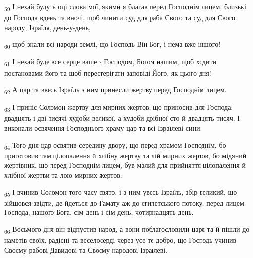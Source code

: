 \begin{tcolorbox}
\textsubscript{59} І нехай будуть оці слова мої, якими я благав перед Господнім лицем, близькі до Господа вдень та вночі, щоб чинити суд для раба Свого та суд для Свого народу, Ізраїля, день-у-день,
\end{tcolorbox}
\begin{tcolorbox}
\textsubscript{60} щоб знали всі народи землі, що Господь Він Бог, і нема вже іншого!
\end{tcolorbox}
\begin{tcolorbox}
\textsubscript{61} І нехай буде все серце ваше з Господом, Богом нашим, щоб ходити постановами його та щоб перестерігати заповіді Його, як цього дня!
\end{tcolorbox}
\begin{tcolorbox}
\textsubscript{62} А цар та ввесь Ізраїль з ним принесли жертву перед Господнім лицем.
\end{tcolorbox}
\begin{tcolorbox}
\textsubscript{63} І приніс Соломон жертву для мирних жертов, що приносив для Господа: двадцять і дві тисячі худоби великої, а худоби дрібної сто й двадцять тисяч. І виконали освячення Господнього храму цар та всі Ізраїлеві сини.
\end{tcolorbox}
\begin{tcolorbox}
\textsubscript{64} Того дня цар освятив середину двору, що перед храмом Господнім, бо приготовив там цілопалення й хлібну жертву та лій мирних жертов, бо мідяний жертівник, що перед Господнім лицем, був малий для прийняття цілопалення й хлібної жертви та лою мирних жертов.
\end{tcolorbox}
\begin{tcolorbox}
\textsubscript{65} І вчинив Соломон того часу свято, і з ним увесь Ізраїль, збір великий, що зійшовся звідти, де йдеться до Гамату аж до єгипетського потоку, перед лицем Господа, нашого Бога, сім день і сім день, чотирнадцять день.
\end{tcolorbox}
\begin{tcolorbox}
\textsubscript{66} Восьмого дня він відпустив народ, а вони поблагословили царя та й пішли до наметів своїх, радісні та веселосерді через усе те добро, що Господь учинив Своєму рабові Давидові та Своєму народові Ізраїлеві.
\end{tcolorbox}
